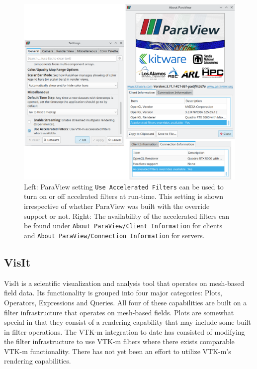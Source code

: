 \begin{figure}[htb]
  \includegraphics[width=\linewidth]{figures/pv-override-settings.png}
  \caption{Left: ParaView setting \texttt{Use Accelerated Filters} can be used to turn on or off accelrated filters at run-time. This setting is shown irrespective of whether ParaView was built with the override support or not. Right: The availability of the accelerated filters can be found under \texttt{About ParaView/Client Information} for clients and \texttt{About ParaView/Connection Information} for servers.}
  \label{fig:paraview_settings}
\end{figure}


\subsection{VisIt}

VisIt is a scientific visualization and analysis tool that operates on mesh-based field data. Its functionality is grouped into four major categories: Plots, Operators, Expressions and Queries. All four of these capabilities are built on a filter infrastructure that operates on mesh-based fields. Plots are somewhat special in that they consist of a rendering capability that may include some built-in filter operations. The VTK-m integration to date has consisted of modifying the filter infrastructure to use VTK-m filters where there exists comparable VTK-m functionality. There has not yet been an effort to utilize VTK-m's rendering capabilities.

